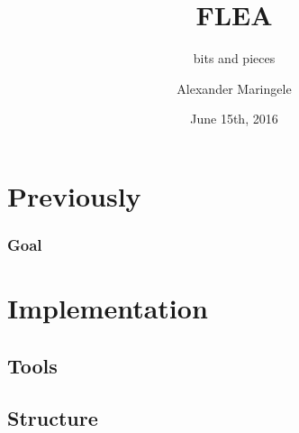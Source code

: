 



\author{Alexander Maringele}
\title{FLEA\\
}
\subtitle{bits and pieces}
\date{June 15th, 2016}

%



 

\frame{\tableofcontents}

%

%





%

\section{Previously}

\begin{frame}
	\frametitle{Goal}
	


\end{frame}



\section{Implementation}

\subsection{Tools}

\subsection{Structure}



